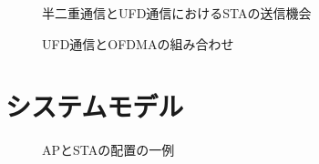 \documentclass[technicalreport]{ieicej}
\begin{document}
	\begin{figure}[t]
		\centering
		\caption{半二重通信とUFD通信におけるSTAの送信機会}
		\label{fig:problem}
	\end{figure}

	\begin{figure}[t]
		\centering
		\caption{UFD通信とOFDMAの組み合わせ}
		\label{fig:ofdma}
	\end{figure}

\section{システムモデル}\label{seq:system}
	\begin{figure}[t]
		\centering
		\caption{APとSTAの配置の一例}
		\label{fig:model}
	\end{figure}
\end{document}
